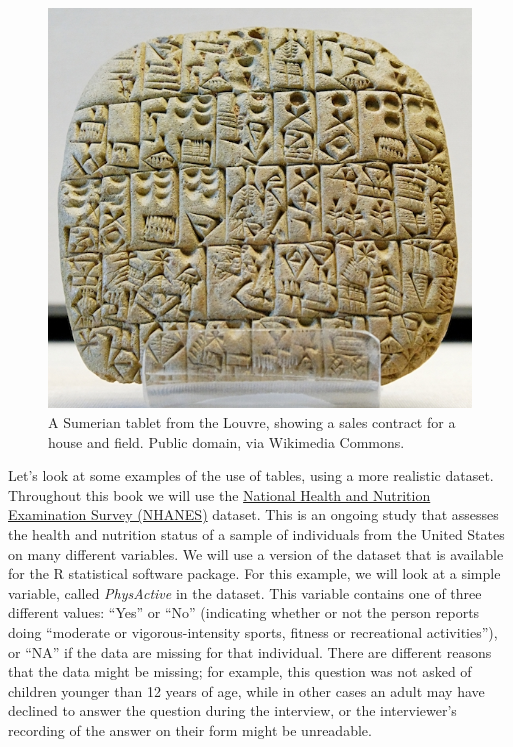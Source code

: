 \documentclass[12pt,]{book}
\theoremstyle{definition}
\theoremstyle{definition}
\theoremstyle{definition}
\theoremstyle{remark}
\begin{document}
\begin{figure}
\includegraphics[height=0.3\textheight]{images/Sales_contract_Shuruppak_Louvre_AO3760} \caption{A Sumerian tablet from the Louvre, showing a sales contract for a house and field.  Public domain, via Wikimedia Commons.}\label{fig:salesContract}
\end{figure}

Let's look at some examples of the use of tables, using a more realistic dataset. Throughout this book we will use the \href{https://www.cdc.gov/nchs/nhanes/index.htm}{National Health and Nutrition Examination Survey (NHANES)} dataset. This is an ongoing study that assesses the health and nutrition status of a sample of individuals from the United States on many different variables. We will use a version of the dataset that is available for the R statistical software package. For this example, we will look at a simple variable, called \emph{PhysActive} in the dataset. This variable contains one of three different values: ``Yes'' or ``No'' (indicating whether or not the person reports doing ``moderate or vigorous-intensity sports, fitness or recreational activities''), or ``NA'' if the data are missing for that individual. There are different reasons that the data might be missing; for example, this question was not asked of children younger than 12 years of age, while in other cases an adult may have declined to answer the question during the interview, or the interviewer's recording of the answer on their form might be unreadable.
\end{document}
